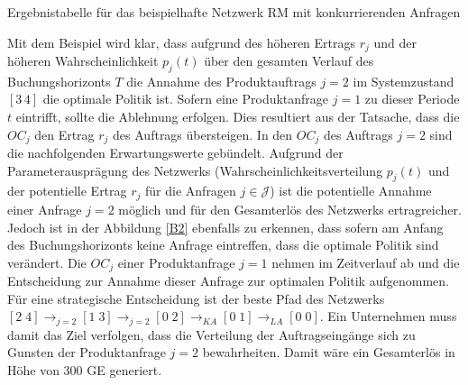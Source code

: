 \begin{table}
\begin{footnotesize}
    \caption{Ergebnistabelle für das beispielhafte Netzwerk RM mit konkurrierenden Anfragen} \label{Tab2}
          \begin{center}
    \vspace*{3mm}
            \end{center}
\end{footnotesize}
\end{table}

Mit dem Beispiel wird klar, dass aufgrund des höheren Ertrags $r_j$ und der höheren Wahrscheinlichkeit $p_j(t)$ über den gesamten Verlauf des Buchungshorizonts $T$ die Annahme des Produktauftrags $j=2$ im Systemzustand $[3\,4]$ die optimale Politik ist. Sofern eine Produktanfrage $j=1$ zu dieser Periode $t$ eintrifft, sollte die Ablehnung erfolgen. Dies resultiert aus der Tatsache, dass die $OC_j$ den Ertrag $r_j$ des Auftrags übersteigen. In den $OC_j$ des Auftrags $j=2$ sind die nachfolgenden Erwartungswerte gebündelt. Aufgrund der Parameterausprägung des Netzwerks (Wahrscheinlichkeitsverteilung $p_j(t)$ und der potentielle Ertrag $r_j$ für die Anfragen $j\in\mathcal{J}$) ist die potentielle Annahme einer Anfrage $j=2$ möglich und für den Gesamterlös des Netzwerks ertragreicher. Jedoch ist in der Abbildung \ref{B2} ebenfalls zu erkennen, dass sofern am Anfang des Buchungshorizonts keine Anfrage eintreffen, dass die optimale Politik sind verändert. Die $OC_j$ einer Produktanfrage $j=1$ nehmen im Zeitverlauf ab und die Entscheidung zur Annahme dieser Anfrage zur optimalen Politik aufgenommen. Für eine strategische Entscheidung ist der beste Pfad des Netzwerks $[2\;4] \rightarrow_{j=2} [1\;3] \rightarrow_{j=2} [0\;2] \rightarrow_{KA} [0\;1]\rightarrow_{LA} [0\;0]$. Ein Unternehmen muss damit das Ziel verfolgen, dass die Verteilung der Auftragseingänge sich zu Gunsten der Produktanfrage $j=2$ bewahrheiten. Damit wäre ein Gesamterlös in Höhe von $300$ GE generiert. 










